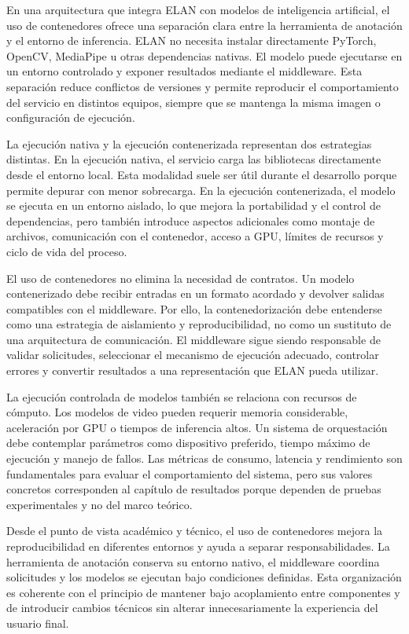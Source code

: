 En una arquitectura que integra ELAN con modelos de inteligencia artificial, el uso de contenedores ofrece una separación clara entre la herramienta de anotación y el entorno de inferencia. ELAN no necesita instalar directamente PyTorch, OpenCV, MediaPipe u otras dependencias nativas. El modelo puede ejecutarse en un entorno controlado y exponer resultados mediante el middleware. Esta separación reduce conflictos de versiones y permite reproducir el comportamiento del servicio en distintos equipos, siempre que se mantenga la misma imagen o configuración de ejecución.

La ejecución nativa y la ejecución contenerizada representan dos estrategias distintas. En la ejecución nativa, el servicio carga las bibliotecas directamente desde el entorno local. Esta modalidad suele ser útil durante el desarrollo porque permite depurar con menor sobrecarga. En la ejecución contenerizada, el modelo se ejecuta en un entorno aislado, lo que mejora la portabilidad y el control de dependencias, pero también introduce aspectos adicionales como montaje de archivos, comunicación con el contenedor, acceso a GPU, límites de recursos y ciclo de vida del proceso.

El uso de contenedores no elimina la necesidad de contratos. Un modelo contenerizado debe recibir entradas en un formato acordado y devolver salidas compatibles con el middleware. Por ello, la contenedorización debe entenderse como una estrategia de aislamiento y reproducibilidad, no como un sustituto de una arquitectura de comunicación. El middleware sigue siendo responsable de validar solicitudes, seleccionar el mecanismo de ejecución adecuado, controlar errores y convertir resultados a una representación que ELAN pueda utilizar.

La ejecución controlada de modelos también se relaciona con recursos de cómputo. Los modelos de video pueden requerir memoria considerable, aceleración por GPU o tiempos de inferencia altos. Un sistema de orquestación debe contemplar parámetros como dispositivo preferido, tiempo máximo de ejecución y manejo de fallos. Las métricas de consumo, latencia y rendimiento son fundamentales para evaluar el comportamiento del sistema, pero sus valores concretos corresponden al capítulo de resultados porque dependen de pruebas experimentales y no del marco teórico.

Desde el punto de vista académico y técnico, el uso de contenedores mejora la reproducibilidad en diferentes entornos y ayuda a separar responsabilidades. La herramienta de anotación conserva su entorno nativo, el middleware coordina solicitudes y los modelos se ejecutan bajo condiciones definidas. Esta organización es coherente con el principio de mantener bajo acoplamiento entre componentes y de introducir cambios técnicos sin alterar innecesariamente la experiencia del usuario final.

